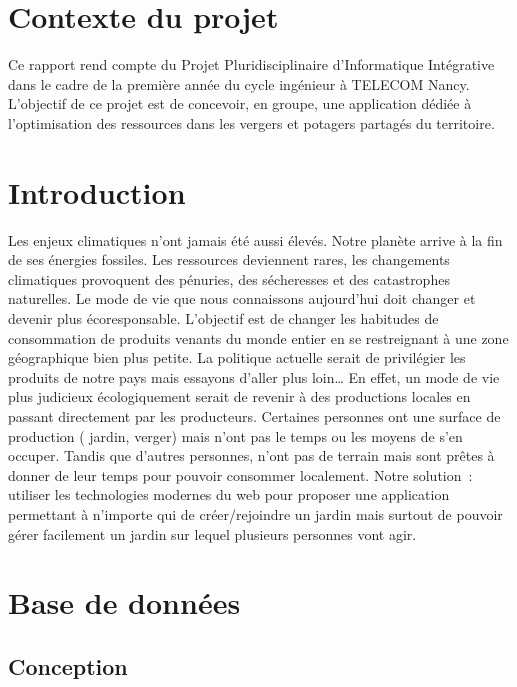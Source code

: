\documentclass[french,a4paper]{article}
\begin{document}
\section{Contexte du projet}
Ce rapport rend compte du Projet Pluridisciplinaire d’Informatique Intégrative dans le cadre de la première année du cycle ingénieur à TELECOM Nancy.
L’objectif de ce projet est de concevoir, en groupe,  une application dédiée à l’optimisation des ressources dans les vergers et potagers partagés du territoire.
\section{Introduction}
Les enjeux climatiques n’ont jamais été aussi élevés. Notre planète arrive à la fin de ses énergies fossiles. Les ressources deviennent rares, les changements climatiques provoquent des pénuries, des sécheresses et des catastrophes naturelles. Le mode de vie que nous connaissons aujourd’hui doit changer et devenir plus écoresponsable. L’objectif est de changer les habitudes de consommation de produits venants du monde entier en se restreignant à une zone géographique bien plus petite. La politique actuelle serait de privilégier les produits de notre pays mais essayons d’aller plus loin…
En effet, un mode de vie plus judicieux écologiquement serait de revenir à des productions locales en passant directement par les producteurs. Certaines personnes ont une surface de production ( jardin, verger) mais n’ont pas le temps ou les moyens de s’en occuper. Tandis que d’autres personnes, n’ont pas de terrain mais sont prêtes à donner de leur temps pour pouvoir consommer localement.
Notre solution~: utiliser les technologies modernes du web pour proposer une application permettant à n’importe qui de créer/rejoindre un jardin mais surtout de pouvoir gérer facilement un jardin sur lequel plusieurs personnes vont agir.
\section{Base de données}
\subsection{Conception}
\end{document}
